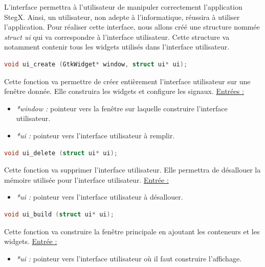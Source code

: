 \documentclass[11pt]{article}
\begin{document}
L'interface permettra à l'utilisateur de manipuler correctement l'application 
StegX. Ainsi, un utilisateur, non adepte à l'informatique, réussira à 
utiliser l'application. 
Pour réaliser cette interface, nous allons créé une structure nommée 
\textit{struct ui} qui va correspondre à l'interface utilisateur. Cette 
structure va notamment contenir tous les widgets utilisés dans l'interface 
utilisateur. 

\begin{lstlisting}[language=c]
void ui_create (GtkWidget* window, struct ui* ui);
\end{lstlisting}

Cette fonction va permettre de créer entièrement l'interface utilisateur 
sur une fenêtre donnée. Elle construira les widgets et configure les signaux. 
\newline
\underline{Entrées :} 
\begin{itemize}
\item \textit{*window :} pointeur vers la fenêtre sur laquelle construire 
l'interface utilisateur. 
\item \textit{*ui :} pointeur vers l'interface utilisateur à remplir. 
\newline 
\end{itemize}

\begin{lstlisting}[language=c]
void ui_delete (struct ui* ui);
\end{lstlisting}

Cette fonction va supprimer l'interface utilisateur. Elle permettra de 
désallouer la mémoire utilisée pour l'interface utilisateur. 
\newline
\underline{Entrée :} 
\begin{itemize}
\item \textit{*ui :} pointeur vers l'interface utilisateur à désallouer. 
\newline 
\end{itemize}

\begin{lstlisting}[language=c]
void ui_build (struct ui* ui);
\end{lstlisting}

Cette fonction va construire la fenêtre principale en ajoutant les conteneurs 
et les widgets. 
\newline
\underline{Entrée :} 
\begin{itemize}
\item \textit{*ui :} pointeur vers l'interface utilisateur où il faut construire 
l'affichage. 
\newline 
\end{itemize}
\end{document}
